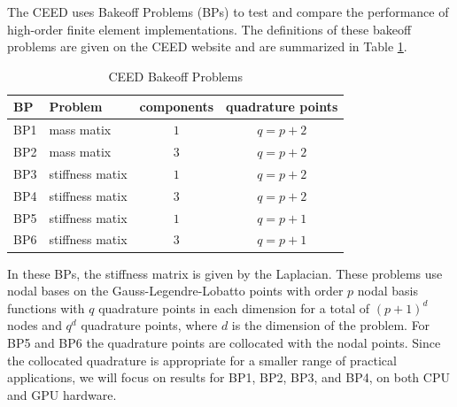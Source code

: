 The CEED uses Bakeoff Problems (BPs) to test and compare the performance of high-order finite element implementations.
The definitions of these bakeoff problems are given on the CEED website \cite{ceed-bps} and are summarized in Table \ref{table:ceedbps}.

\begin{table}[ht!]
\begin{center}
\begin{tabular}{l l c c}
  \toprule
  BP  & Problem         & components & quadrature points  \\
  \toprule
  BP1 & mass matix      & $1$        & $q = p + 2$        \\
  BP2 & mass matix      & $3$        & $q = p + 2$        \\
  \midrule
  BP3 & stiffness matix & $1$        & $q = p + 2$        \\
  BP4 & stiffness matix & $3$        & $q = p + 2$        \\
  \midrule
  BP5 & stiffness matix & $1$        & $q = p + 1$        \\
  BP6 & stiffness matix & $3$        & $q = p + 1$        \\
  \bottomrule
\end{tabular}
\end{center}
\caption{CEED Bakeoff Problems}
\label{table:ceedbps}
\end{table}

In these BPs, the stiffness matrix is given by the Laplacian.
These problems use nodal bases on the Gauss-Legendre-Lobatto points with order $p$ nodal basis functions with $q$ quadrature points in each dimension for a total of $\left( p + 1 \right)^d$ nodes and $q^d$ quadrature points, where $d$ is the dimension of the problem.
For BP5 and BP6 the quadrature points are collocated with the nodal points.
Since the collocated quadrature is appropriate for a smaller range of practical applications, we will focus on results for BP1, BP2, BP3, and BP4, on both CPU and GPU hardware.

